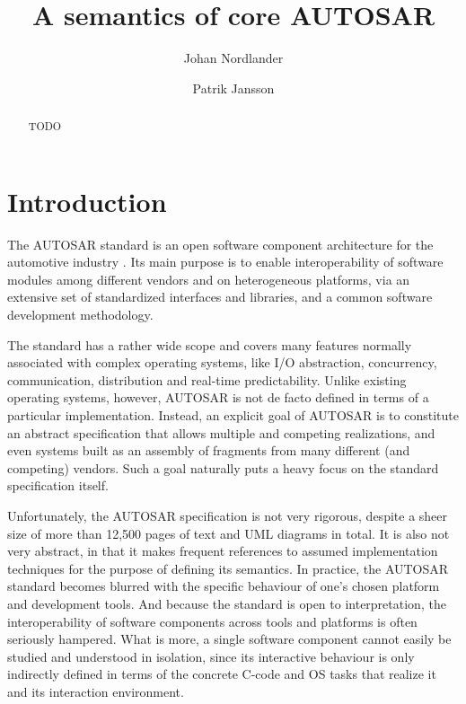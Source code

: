 \documentclass[twocolumn]{article}
\title{A semantics of core AUTOSAR}
\author{Johan Nordlander \and Patrik Jansson}
\begin{document}
\maketitle
\begin{abstract}
TODO

\end{abstract}

\section{Introduction}
\label{sec:Intro}

The AUTOSAR standard is an open software component architecture for the automotive industry \cite{AR:Homepage}. Its main purpose is to enable interoperability of software modules among different vendors and on heterogeneous platforms, via an extensive set of standardized interfaces and libraries, and a common software development methodology.

The standard has a rather wide scope and covers many features normally associated with complex operating systems, like I/O abstraction, concurrency, communication, distribution and real-time predictability. Unlike existing operating systems, however, AUTOSAR is not de facto defined in terms of a particular implementation. Instead, an explicit goal of AUTOSAR is to constitute an abstract specification that allows multiple and competing realizations, and even systems built as an assembly of fragments from many different (and competing) vendors. Such a goal naturally puts a heavy focus on the standard specification itself.

Unfortunately, the AUTOSAR specification is not very rigorous, despite a sheer size of more than 12,500 pages of text and UML diagrams in total. It is also not very abstract, in that it makes frequent references to assumed implementation techniques for the purpose of defining its semantics. In practice, the AUTOSAR standard becomes blurred with the specific behaviour of one's chosen platform and development tools. And because the standard is open to interpretation, the interoperability of software components across tools and platforms is often seriously hampered. What is more, a single software component cannot easily be studied and understood in isolation, since its interactive behaviour is only indirectly defined in terms of the concrete C-code and OS tasks that realize it and its interaction environment.
\end{document}
